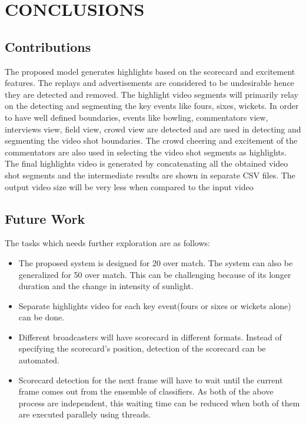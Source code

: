 
\chapter{CONCLUSIONS} %
\section{Contributions}
The proposed model generates highlights based on the scorecard and excitement features. The replays and advertisements are considered to be undesirable hence they are detected and removed. The highlight video segments will primarily relay on the detecting and segmenting the key events like fours, sixes, wickets. In order to have well defined boundaries, events like bowling, commentators view, interviews view, field view, crowd view are detected and are used in detecting and segmenting the video shot boundaries. The crowd cheering and excitement of the commentators are also used in selecting the video shot segments as highlights. The final highlights video is generated by concatenating all the obtained video shot segments and the intermediate results are shown in separate CSV files. The output video size will be very less when compared to the input video 

\section{Future Work}
The tasks which needs further exploration are as follows:
\begin{itemize}
    \item The proposed system is designed for 20 over match. The system can also be generalized for 50 over match. This can be challenging because of its longer duration and the change in intensity of sunlight.
    \item Separate highlights video for each key event(fours or sixes or wickets alone) can be done.
    \item Different broadcasters will have scorecard in different formats. Instead of specifying the scorecard's position, detection of the scorecard can be automated.
    \item Scorecard detection for the next frame will have to wait until the current frame comes out from the ensemble of classifiers. As both of the above process are independent, this waiting time can be reduced when both of them are executed parallely using threads.
\end{itemize}


